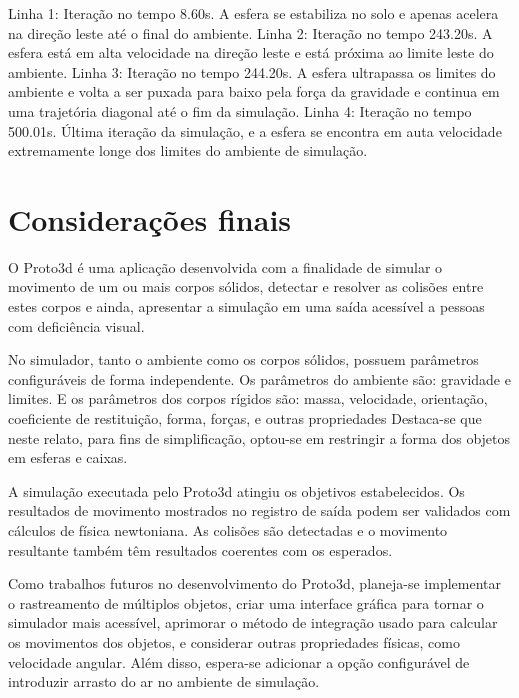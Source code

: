 \documentclass[12pt]{article}
\begin{document}
Linha 1: Iteração no tempo 8.60s. A esfera se estabiliza no solo e apenas acelera na direção leste até o final do ambiente.
Linha 2: Iteração no tempo 243.20s. A esfera está em alta velocidade na direção leste e está próxima ao limite leste do ambiente.
Linha 3: Iteração no tempo 244.20s. A esfera ultrapassa os limites do ambiente e volta a ser puxada para baixo pela força da gravidade e continua em uma trajetória diagonal até o fim da simulação.
Linha 4: Iteração no tempo 500.01s. Última iteração da simulação, e a esfera se encontra em auta velocidade extremamente longe dos limites do ambiente de simulação.

\section{Considerações finais}
O Proto3d é uma aplicação desenvolvida com a finalidade de simular o movimento de um ou mais corpos sólidos, detectar e resolver as colisões entre estes corpos e ainda, apresentar a simulação em uma saída acessível a pessoas com deficiência visual.

No simulador, tanto o ambiente como os corpos sólidos, possuem parâmetros configuráveis de forma independente. Os parâmetros do ambiente são:  gravidade e limites. E os parâmetros dos corpos rígidos são: massa, velocidade, orientação, coeficiente de restituição, forma, forças, e outras propriedades Destaca-se que neste relato, para fins de simplificação, optou-se em restringir a forma dos objetos em esferas e caixas.

A simulação executada pelo Proto3d atingiu os objetivos estabelecidos. Os resultados de movimento mostrados no registro de saída podem ser validados com cálculos de física newtoniana. As colisões são detectadas e o movimento resultante também têm resultados coerentes com os esperados. 

Como trabalhos futuros no desenvolvimento do Proto3d, planeja-se implementar o rastreamento de múltiplos objetos, criar uma interface gráfica para tornar o simulador mais acessível, aprimorar o método de integração usado para calcular os movimentos dos objetos, e considerar outras propriedades físicas, como velocidade angular. Além disso, espera-se adicionar a opção configurável de introduzir arrasto do ar no ambiente de simulação.



\end{document}
